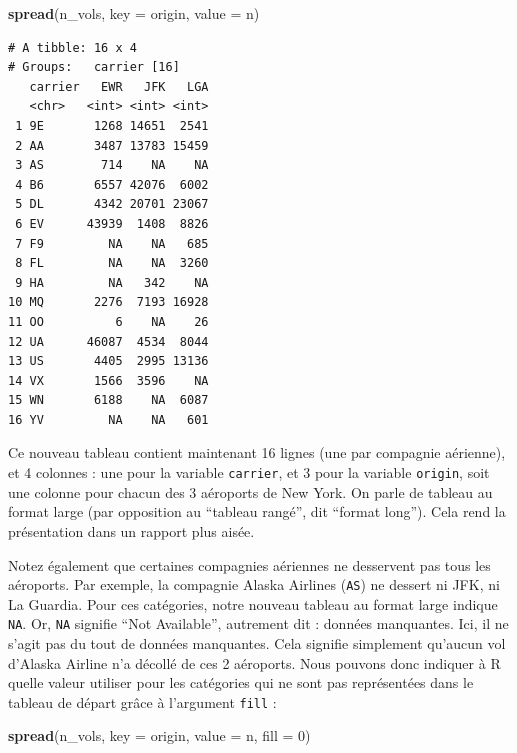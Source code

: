 \documentclass[a4paperpaper,]{article}
\newenvironment{Shaded}{\begin{snugshade}}{\end{snugshade}}
\newcommand{\DataTypeTok}[1]{\textcolor[rgb]{0.00,0.34,0.68}{#1}}
\newcommand{\DecValTok}[1]{\textcolor[rgb]{0.69,0.50,0.00}{#1}}
\newcommand{\KeywordTok}[1]{\textcolor[rgb]{0.12,0.11,0.11}{\textbf{#1}}}
\newcommand{\NormalTok}[1]{\textcolor[rgb]{0.12,0.11,0.11}{#1}}
\theoremstyle{definition}
\theoremstyle{definition}
\theoremstyle{definition}
\theoremstyle{remark}
\begin{document}
\begin{Shaded}
\begin{Highlighting}[]
\KeywordTok{spread}\NormalTok{(n_vols, }\DataTypeTok{key =}\NormalTok{ origin, }\DataTypeTok{value =}\NormalTok{ n)}
\end{Highlighting}
\end{Shaded}

\begin{verbatim}
# A tibble: 16 x 4
# Groups:   carrier [16]
   carrier   EWR   JFK   LGA
   <chr>   <int> <int> <int>
 1 9E       1268 14651  2541
 2 AA       3487 13783 15459
 3 AS        714    NA    NA
 4 B6       6557 42076  6002
 5 DL       4342 20701 23067
 6 EV      43939  1408  8826
 7 F9         NA    NA   685
 8 FL         NA    NA  3260
 9 HA         NA   342    NA
10 MQ       2276  7193 16928
11 OO          6    NA    26
12 UA      46087  4534  8044
13 US       4405  2995 13136
14 VX       1566  3596    NA
15 WN       6188    NA  6087
16 YV         NA    NA   601
\end{verbatim}

Ce nouveau tableau contient maintenant 16 lignes (une par compagnie
aérienne), et 4 colonnes : une pour la variable \texttt{carrier}, et 3
pour la variable \texttt{origin}, soit une colonne pour chacun des 3
aéroports de New York. On parle de tableau au format large (par
opposition au ``tableau rangé'', dit ``format long''). Cela rend la
présentation dans un rapport plus aisée.

Notez également que certaines compagnies aériennes ne desservent pas
tous les aéroports. Par exemple, la compagnie Alaska Airlines
(\texttt{AS}) ne dessert ni JFK, ni La Guardia. Pour ces catégories,
notre nouveau tableau au format large indique \texttt{NA}. Or,
\texttt{NA} signifie ``Not Available'', autrement dit : données
manquantes. Ici, il ne s'agit pas du tout de données manquantes. Cela
signifie simplement qu'aucun vol d'Alaska Airline n'a décollé de ces 2
aéroports. Nous pouvons donc indiquer à R quelle valeur utiliser pour
les catégories qui ne sont pas représentées dans le tableau de départ
grâce à l'argument \texttt{fill} :

\begin{Shaded}
\begin{Highlighting}[]
\KeywordTok{spread}\NormalTok{(n_vols, }\DataTypeTok{key =}\NormalTok{ origin, }\DataTypeTok{value =}\NormalTok{ n, }\DataTypeTok{fill =} \DecValTok{0}\NormalTok{)}
\end{Highlighting}
\end{Shaded}
\end{document}
